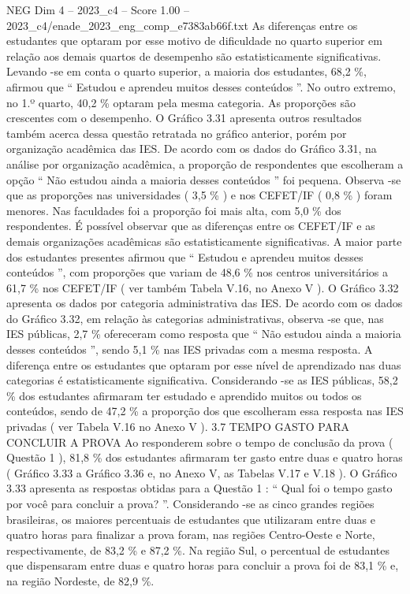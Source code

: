 \begin{textsample}{NEG Dim 4 – 2023\_c4 – Score 1.00 – 2023\_c4/enade\_2023\_eng\_comp\_e7383ab66f.txt}
As diferenças entre os estudantes que optaram por esse motivo de dificuldade no quarto superior em relação aos demais quartos de desempenho são estatisticamente significativas.
Levando -se em conta o quarto superior, a maioria dos estudantes, 68,2 \%, afirmou que “ Estudou e aprendeu muitos desses conteúdos ”.
No outro extremo, no 1.º quarto, 40,2 \% optaram pela mesma categoria.
As proporções são crescentes com o desempenho.
O Gráfico 3.31 apresenta outros resultados também acerca dessa questão retratada no gráfico anterior, porém por organização acadêmica das IES.
De acordo com os dados do Gráfico 3.31, na análise por organização acadêmica, a proporção de respondentes que escolheram a opção “ Não estudou ainda a maioria desses conteúdos ” foi pequena.
Observa -se que as proporções nas universidades ( 3,5 \% ) e nos CEFET/IF ( 0,8 \% ) foram menores.
Nas faculdades foi a proporção foi mais alta, com 5,0 \% dos respondentes.
É possível observar que as diferenças entre os CEFET/IF e as demais organizações acadêmicas são estatisticamente significativas.
A maior parte dos estudantes presentes afirmou que “ Estudou e aprendeu muitos desses conteúdos ”, com proporções que variam de 48,6 \% nos centros universitários a 61,7 \% nos CEFET/IF ( ver também Tabela V.16, no Anexo V ).
O Gráfico 3.32 apresenta os dados por categoria administrativa das IES.
De acordo com os dados do Gráfico 3.32, em relação às categorias administrativas, observa -se que, nas IES públicas, 2,7 \% ofereceram como resposta que “ Não estudou ainda a maioria desses conteúdos ”, sendo 5,1 \% nas IES privadas com a mesma resposta.
A diferença entre os estudantes que optaram por esse nível de aprendizado nas duas categorias é estatisticamente significativa.
Considerando -se as IES públicas, 58,2 \% dos estudantes afirmaram ter estudado e aprendido muitos ou todos os conteúdos, sendo de 47,2 \% a proporção dos que escolheram essa resposta nas IES privadas ( ver Tabela V.16 no Anexo V ). 3.7 TEMPO GASTO PARA CONCLUIR A PROVA Ao responderem sobre o tempo de conclusão da prova ( Questão 1 ), 81,8 \% dos estudantes afirmaram ter gasto entre duas e quatro horas ( Gráfico 3.33 a Gráfico 3.36 e, no Anexo V, as Tabelas V.17 e V.18 ).
O Gráfico 3.33 apresenta as respostas obtidas para a Questão 1 : “ Qual foi o tempo gasto por você para concluir a prova? ”.
Considerando -se as cinco grandes regiões brasileiras, os maiores percentuais de estudantes que utilizaram entre duas e quatro horas para finalizar a prova foram, nas regiões Centro-Oeste e Norte, respectivamente, de 83,2 \% e 87,2 \%.
Na região Sul, o percentual de estudantes que dispensaram entre duas e quatro horas para concluir a prova foi de 83,1 \% e, na região Nordeste, de 82,9 \%.

\end{textsample}
